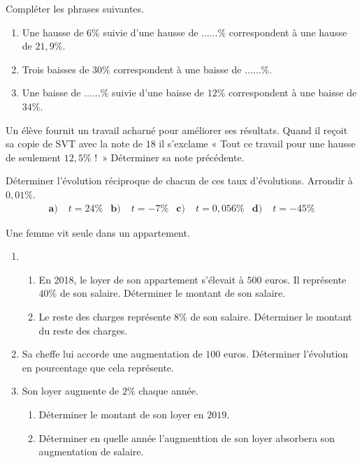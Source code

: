 \documentclass[11pt]{article}
\begin{document}
\begin{exo}
Compléter les phrases suivantes.
\begin{enumerate}
  \item Une hausse de $6\%$ suivie d'une hausse de $\dots\dots\%$ correspondent
    à une hausse de $21,9\%$.
  \item Trois baisses de $30\%$ correspondent à une baisse de $\dots\dots\%$.
  \item Une baisse de $\dots\dots\%$ suivie d'une baisse de $12\%$ correspondent
    à une baisse de $34\%$.
\end{enumerate}
\end{exo}

\begin{exo}
Un élève fournit un travail acharné pour améliorer ses
résultats. Quand il reçoit sa copie de SVT avec la note de $18$ il s'exclame «
Tout ce travail pour une hausse de seulement $12,5\%$ !~» Déterminer sa note
précédente.
\end{exo}

\begin{exo}
Déterminer l'évolution réciproque de chacun de ces taux
d'évolutions. Arrondir à $0,01\%$.
\begin{align*}
  \textbf{a)}\;& t = 24\% &
  \textbf{b)}\;& t = -7\% &
  \textbf{c)}\;& t = 0,056\% &
  \textbf{d)}\;& t = -45\%
\end{align*}
\end{exo}

\begin{exo}
Une femme vit seule dans un appartement.
\begin{enumerate}
  \item \begin{enumerate}
      \item En 2018, le loyer de son appartement s'élevait à $500$ euros. Il
        représente $40\%$ de son salaire. Déterminer le montant de son salaire.
      \item Le reste des charges représente $8\%$ de son salaire. Déterminer le
        montant du reste des charges.
    \end{enumerate}
  \item Sa cheffe lui accorde une augmentation de $100$ euros. Déterminer
    l'évolution en pourcentage que cela représente.
  \item Son loyer augmente de $2\%$ chaque année.
    \begin{enumerate}
      \item Déterminer le montant de son loyer en $2019$.
      \item Déterminer en quelle année l'augmenttion de son loyer absorbera son
        augmentation de salaire.
    \end{enumerate}
\end{enumerate}
\end{exo}
\end{document}
